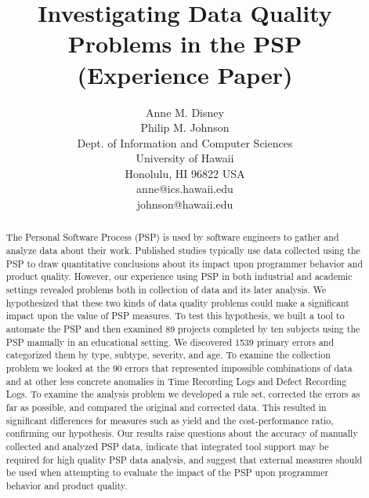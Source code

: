 



\title{Investigating Data Quality Problems in the PSP \\
       (Experience Paper)}

\author{
        Anne M. Disney\\
        Philip M. Johnson\\
        Dept. of Information and Computer Sciences\\
        University of Hawaii\\
        Honolulu, HI  96822 USA\\
        anne@ics.hawaii.edu\\
        johnson@hawaii.edu
       }


\maketitle

\begin{abstract}
  
  The Personal Software Process (PSP) is used by software engineers to
  gather and analyze data about their work.  Published studies typically
  use data collected using the PSP to draw quantitative conclusions about
  its impact upon programmer behavior and product quality.  However,
  our experience using PSP in both industrial and academic settings
  revealed problems both in collection of data and its later analysis.
  We hypothesized that these two kinds of data quality problems could make a
  significant impact upon the value of PSP measures.  To test this
  hypothesis, we built a tool to automate the PSP and then examined 89
  projects completed by ten subjects using the PSP manually in an
  educational setting.  We discovered 1539 primary errors and categorized
  them by type, subtype, severity, and age.  To examine the collection
  problem we looked at the 90 errors that represented impossible
  combinations of data and at other less concrete anomalies in Time
  Recording Logs and Defect Recording Logs.  To examine the analysis
  problem we developed a rule set, corrected the errors as far as possible,
  and compared the original and corrected data.  This resulted in
  significant differences for measures such as yield and the
  cost-performance ratio, confirming our hypothesis.  Our results raise
  questions about the accuracy of manually collected and analyzed PSP data,
  indicate that integrated tool support may be required for high quality
  PSP data analysis, and suggest that external measures
  should be used when attempting to evaluate the impact of the PSP upon
  programmer behavior and product quality.

\end{abstract}

